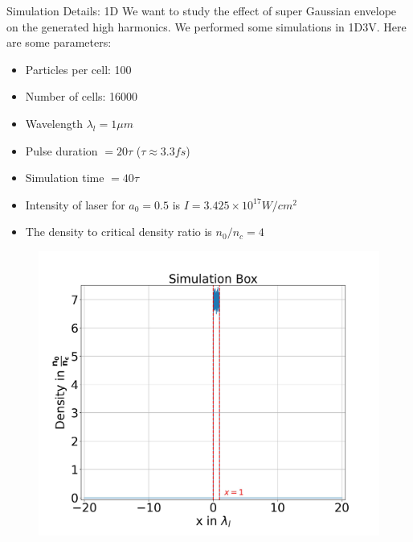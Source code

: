 \documentclass{beamer}
\begin{document}
\begin{frame}{Simulation Details: 1D}
    \small
    We want to study the effect of super Gaussian envelope on the generated high harmonics. We performed some simulations in 1D3V. Here are some parameters:

    \begin{minipage}[t]{0.48\linewidth}
        \begin{itemize}
            \item Particles per cell: 100
            \item Number of cells: 16000
            \item Wavelength $\lambda_l = 1 \mu m$
            \item Pulse duration $= 20 \tau$ ($\tau\approx 3.3 fs$)
            \item Simulation time $= 40 \tau$
            \item Intensity of laser for $a_0 = 0.5$ is $I = 3.425 \times 10^{17} W/cm^2$
            \item The density to critical density ratio is $n_0/n_c = 4$
        \end{itemize}
    \end{minipage}
    \begin{minipage}[t]{0.48\linewidth}
        \begin{figure}
            \centering
            \includegraphics[width=1.0\textwidth, height=0.62\textheight]{images/plasma.jpg}
            \label{fig:plasma}
        \end{figure}
    \end{minipage}
\end{frame}
\end{document}
